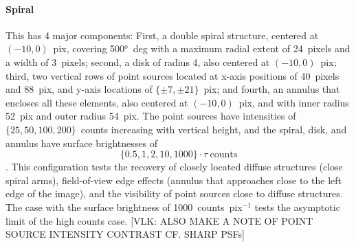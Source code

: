 \documentclass[twocolumn]{aastex631}
\newcommand{\vlk}[1]{{\color{blue} [VLK: #1]}}
\begin{document}
    \paragraph{Spiral} This has 4 major components: First, a double spiral structure, centered at $(-10, 0)$~pix, covering 500$^o$~deg with a maximum radial extent of 24~pixels and a width of 3~pixels; second, a disk of radius 4, also centered at $(-10, 0)$~pix; third, two vertical rows of point sources located at x-axis positions of 40~pixels and 88~pix, and y-axis locations of $\{\pm7,\pm21\}$~pix; and fourth, an annulus that encloses all these elements, also centered at $(-10, 0)$~pix, and with inner radius 52~pix and outer radius 54~pix.  
    The point sources have intensities of $\{25, 50, 100, 200\}$~counts increasing with vertical height, and the spiral, disk, and annulus have surface brightnesses of $$\{0.5, 1, 2, 10, 1000\} \cdot \tau ~\textrm{counts}$$.  This configuration tests the recovery of closely located diffuse structures (close spiral arms), field-of-view edge effects (annulus that approaches close to the left edge of the image), and the visibility of point sources close to diffuse structures.  The case with the surface brightness of 1000~counts~pix$^{-1}$ tests the asymptotic limit of the high counts case. \vlk{ALSO MAKE A NOTE OF POINT SOURCE INTENSITY CONTRAST CF. SHARP PSFs}


\end{document}
